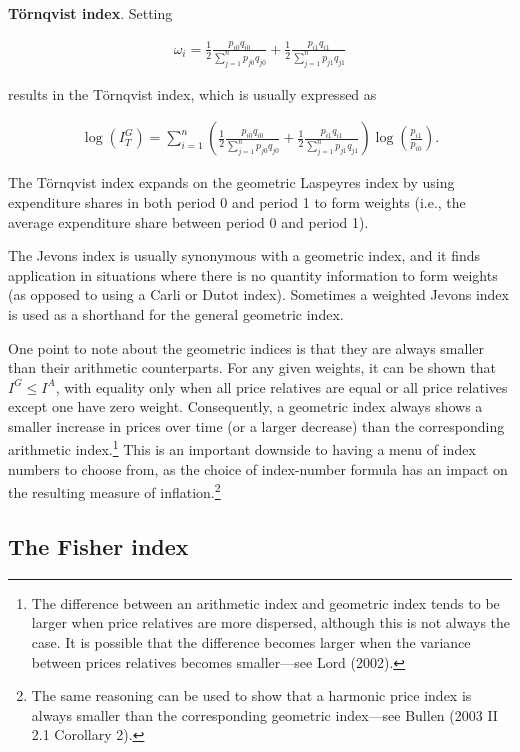 \documentclass[]{article}
\begin{document}
\textbf{Törnqvist index}. Setting

\begin{align*}
\omega_{i} = \frac{1}{2} \frac{p_{i0} q_{i0}}{\sum_{j = 1}^{n} p_{j0} q_{j0}} + \frac{1}{2} \frac{p_{i1} q_{i1}}{\sum_{j = 1}^{n} p_{j1} q_{j1}}
\end{align*}

results in the Törnqvist index, which is usually expressed as

\begin{align*}
\log(I^{G}_{T}) = \sum_{i = 1}^{n} \left(\frac{1}{2} \frac{p_{i0} q_{i0}}{\sum_{j = 1}^{n} p_{j0} q_{j0}} + \frac{1}{2} \frac{p_{i1} q_{i1}}{\sum_{j = 1}^{n} p_{j1} q_{j1}}\right) \log\left(\frac{p_{i1}}{p_{i0}}\right).
\end{align*}

The Törnqvist index expands on the geometric Laspeyres index by using expenditure shares in both period 0 and period 1 to form weights (i.e., the average expenditure share between period 0 and period 1).

The Jevons index is usually synonymous with a geometric index, and it finds application in situations where there is no quantity information to form weights (as opposed to using a Carli or Dutot index). Sometimes a weighted Jevons index is used as a shorthand for the general geometric index.

One point to note about the geometric indices is that they are always smaller than their arithmetic counterparts. For any given weights, it can be shown that \(I^{G} \leq I^{A}\), with equality only when all price relatives are equal or all price relatives except one have zero weight. Consequently, a geometric index always shows a smaller increase in prices over time (or a larger decrease) than the corresponding arithmetic index.\footnote{The difference between an arithmetic index and geometric index tends to be larger when price relatives are more dispersed, although this is not always the case. It is possible that the difference becomes larger when the variance between prices relatives becomes smaller---see Lord (2002).} This is an important downside to having a menu of index numbers to choose from, as the choice of index-number formula has an impact on the resulting measure of inflation.\footnote{The same reasoning can be used to show that a harmonic price index is always smaller than the corresponding geometric index---see Bullen (2003 II 2.1 Corollary 2).}

\hypertarget{the-fisher-index}{%
\subsection{The Fisher index}\label{the-fisher-index}}
\end{document}
